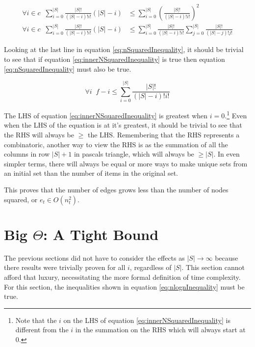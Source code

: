 \documentclass{article}
\begin{document}
\begin{equation}
    \begin{split}
        \forall i\in c\;\; \sum_{i=0}^{|S|}\frac{|S|!}{(|S|-i)!i!}(|S|-i) & \le \sum_{i=0}^{|S|}\left(\frac{|S|!}{(|S|-i)!i!}\right)^2
        \\
        \forall i\in c\;\; \sum_{i=0}^{|S|}\frac{|S|!}{(|S|-i)!i!}(|S|-i) & \le \sum_{i=0}^{|S|}\frac{|S|!}{(|S|-i)!i!}\sum_{j=0}^{|S|}\frac{|S|!}{(|S|-j)!j!}
    \end{split}
    \label{eq:nSquaredInequality}
\end{equation}

Looking at the last line in equation \ref{eq:nSquaredInequality}, it should be trivial to see that if equation \ref{eq:innerNSquaredInequality} is true then equation \ref{eq:nSquaredInequality} must also be true.

\begin{equation}
    \forall i\;\; f-i\le\sum_{i=0}^{|S|}\frac{|S|!}{(|S|-i)!i!}
    \label{eq:innerNSquaredInequality}
\end{equation}

The LHS of equation \ref{eq:innerNSquaredInequality} is greatest when $i=0$.\footnote{Note that the $i$ on the LHS of equation \ref{eq:innerNSquaredInequality} is different from the $i$ in the summation on the RHS which will always start at $0$.} Even when the LHS of the equation is at it's greatest, it should be trivial to see that the RHS will always be $\ge$ the LHS. Remembering that the RHS represents a combinatoric, another way to view the RHS is as the summation of all the columns in row $|S|+1$ in pascals triangle, which will always be $\ge|S|$. In even simpler terms, there will always be equal or more ways to make unique sets from an initial set than the number of items in the original set.

This proves that the number of edges grows less than the number of nodes squared, or $e_t\in O(n_t^2)$.

\section{Big $\Theta$: A Tight Bound}
\label{sec:TightBound}

The previous sections did not have to consider the effects as $|S|\to \infty$ because there results were trivially proven for all $i$, regardless of $|S|$. This section cannot afford that luxury, necessitating the more formal definition of time complexity. For this section, the inequalities shown in equation \ref{eq:nlognInequality} must be true.
\end{document}
